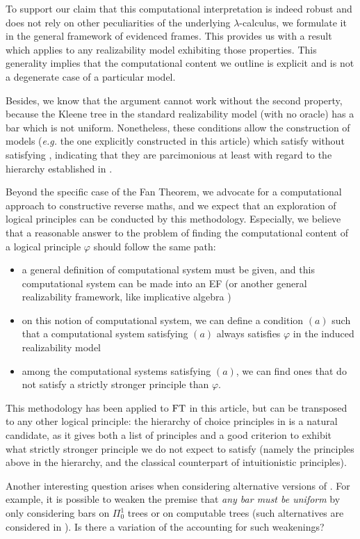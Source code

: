 \documentclass[a4paper,UKenglish,cleveref, autoref, thm-restate]{lipics-v2021}
\begin{document}
To support our claim that this computational interpretation is indeed robust and does not rely on other peculiarities of the underlying $\lambda$-calculus,
we formulate it in the general framework of evidenced frames.
This provides us with a result which applies to any realizability model
exhibiting those properties.
This generality implies that the computational content we outline
is explicit and is not a degenerate case of a particular model.

Besides, we know that the argument cannot work without the second property,
because the Kleene tree in the standard realizability model (with no oracle)
has a bar which is not uniform. Nonetheless, these conditions allow the
construction of models (\textit{e.g.} the one explicitly constructed in this
article) which satisfy \FT without satisfying \WKL, indicating that they are
parcimonious at least with regard to the hierarchy established in \cite{BreHer21}.




Beyond the specific case of the Fan Theorem, we advocate for a computational approach
to constructive reverse maths, and we expect that an exploration of logical principles
can be conducted by this methodology.
Especially, we believe that a reasonable answer to the problem of
finding the computational content of a logical
principle $\varphi$ should follow the same path:
\begin{itemize}
\item a general definition of computational system must be given,
and this computational system can be made into an EF
(or another general realizability framework, like implicative algebra \cite{Miquel20})
\item on this notion of computational system, we can define a condition $(a)$
such that a computational system satisfying $(a)$ always satisfies $\varphi$ in the
induced realizability model
\item among the computational systems satisfying $(a)$, we can find ones
that do not satisfy a strictly stronger principle than $\varphi$.
\end{itemize}

This methodology has been applied to $\mathrm{FT}$ in this article,
but can be transposed to any other logical principle:
the hierarchy of choice principles in \cite{BreHer21} is a natural
candidate, as it gives both a list of principles and a good criterion
to exhibit what strictly stronger principle we do not expect to satisfy
(namely the principles above in the hierarchy, and the classical counterpart
of intuitionistic principles).





Another interesting question arises when considering alternative versions of \FT. For example, it is possible to weaken the premise that \emph{any bar must be uniform} by only considering bars on $\Pi_0^1$ trees or on computable trees (such alternatives are considered in \cite{LubRat13}).
Is there a variation of the  accounting for such weakenings?

\clearpage


\end{document}
